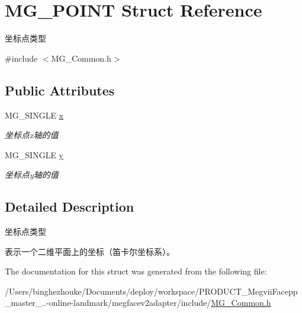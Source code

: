 \hypertarget{struct_m_g___p_o_i_n_t}{}\section{M\+G\+\_\+\+P\+O\+I\+NT Struct Reference}
\label{struct_m_g___p_o_i_n_t}


坐标点类型  




{\ttfamily \#include $<$M\+G\+\_\+\+Common.\+h$>$}

\subsection*{Public Attributes}
\begin{DoxyCompactItemize}
\item 
\mbox{\label{struct_m_g___p_o_i_n_t_ab66497ca58ea473612e15b84ced15e78}} 
M\+G\+\_\+\+S\+I\+N\+G\+LE \hyperlink{struct_m_g___p_o_i_n_t_ab66497ca58ea473612e15b84ced15e78}{x}
\begin{DoxyCompactList}\small\item\em 坐标点x轴的值 \end{DoxyCompactList}\item 
\mbox{\label{struct_m_g___p_o_i_n_t_ab3d4c93f21ed312d4d4d2df3508d4e11}} 
M\+G\+\_\+\+S\+I\+N\+G\+LE \hyperlink{struct_m_g___p_o_i_n_t_ab3d4c93f21ed312d4d4d2df3508d4e11}{y}
\begin{DoxyCompactList}\small\item\em 坐标点y轴的值 \end{DoxyCompactList}\end{DoxyCompactItemize}


\subsection{Detailed Description}
坐标点类型 

表示一个二维平面上的坐标（笛卡尔坐标系）。 

The documentation for this struct was generated from the following file\+:\begin{DoxyCompactItemize}
\item 
/\+Users/binghezhouke/\+Documents/deploy/workspace/\+P\+R\+O\+D\+U\+C\+T\+\_\+\+Megvii\+Facepp\+\_\+master\+\_..-\/online-\/landmark/megfacev2adapter/include/\hyperlink{_m_g___common_8h}{M\+G\+\_\+\+Common.\+h}\end{DoxyCompactItemize}
